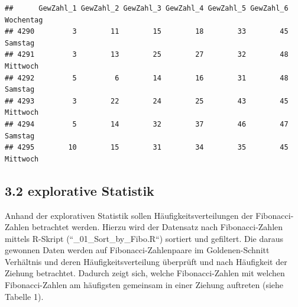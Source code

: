 \documentclass[ngerman,]{article}
\begin{document}
\begin{verbatim}
##      GewZahl_1 GewZahl_2 GewZahl_3 GewZahl_4 GewZahl_5 GewZahl_6 Wochentag
## 4290         3        11        15        18        33        45   Samstag
## 4291         3        13        25        27        32        48  Mittwoch
## 4292         5         6        14        16        31        48   Samstag
## 4293         3        22        24        25        43        45  Mittwoch
## 4294         5        14        32        37        46        47   Samstag
## 4295        10        15        31        34        35        45  Mittwoch
\end{verbatim}

\subsection{3.2 explorative Statistik}\label{explorative-statistik}

Anhand der explorativen Statistik sollen Häufigkeitsverteilungen der
Fibonacci-Zahlen betrachtet werden. Hierzu wird der Datensatz nach
Fibonacci-Zahlen mittels R-Skript (``\_01\_Sort\_by\_Fibo.R``) sortiert
und gefiltert. Die daraus gewonnen Daten werden auf
Fibonacci-Zahlenpaare im Goldenen-Schnitt Verhältnis und deren
Häufigkeitsverteilung überprüft und nach Häufigkeit der Ziehung
betrachtet. Dadurch zeigt sich, welche Fibonacci-Zahlen mit welchen
Fibonacci-Zahlen am häufigsten gemeinsam in einer Ziehung auftreten
(siehe Tabelle 1).
\end{document}
